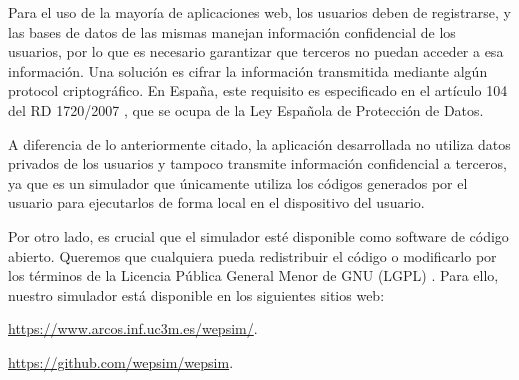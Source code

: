 Para el uso de la mayoría de aplicaciones web, los usuarios deben de registrarse, y las bases de datos de las mismas manejan información confidencial de los usuarios, por lo que es necesario garantizar que terceros no puedan acceder a esa información. Una solución es cifrar la información transmitida mediante algún \gls{protocol} criptográfico. En España, este requisito es especificado en el artículo 104 del RD 1720/2007 \cite{boe2008}, que se ocupa de la Ley Española de Protección de Datos.


A diferencia de lo anteriormente citado, la aplicación desarrollada no utiliza datos privados de los usuarios y tampoco transmite información confidencial a terceros, ya que es un simulador que únicamente utiliza los códigos generados por el usuario para ejecutarlos de forma local en el dispositivo del usuario.


Por otro lado, es crucial que el simulador esté disponible como software de código abierto. Queremos que cualquiera pueda redistribuir el código o modificarlo por los términos de la Licencia Pública General Menor de GNU (LGPL) \cite{gnulgpl}. Para ello, nuestro simulador está disponible en los siguientes sitios web: 

\url{https://www.arcos.inf.uc3m.es/wepsim/}.

\url{https://github.com/wepsim/wepsim}.

